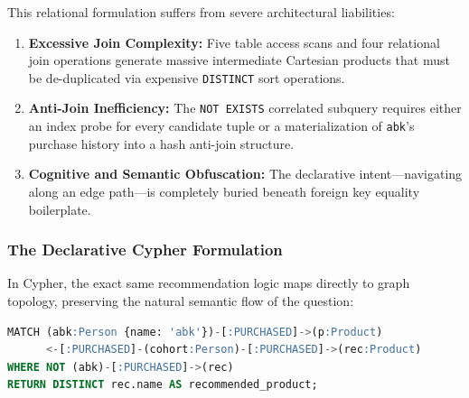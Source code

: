 \documentclass[10pt,twocolumn,letterpaper]{article}
\begin{document}
This relational formulation suffers from severe architectural liabilities:
\begin{enumerate}
    \item \textbf{Excessive Join Complexity:} Five table access scans and four relational join operations generate massive intermediate Cartesian products that must be de-duplicated via expensive \texttt{DISTINCT} sort operations.
    \item \textbf{Anti-Join Inefficiency:} The \texttt{NOT EXISTS} correlated subquery requires either an index probe for every candidate tuple or a materialization of \texttt{abk}'s purchase history into a hash anti-join structure.
    \item \textbf{Cognitive and Semantic Obfuscation:} The declarative intent---navigating along an edge path---is completely buried beneath foreign key equality boilerplate.
\end{enumerate}

\subsubsection{The Declarative Cypher Formulation}
In Cypher, the exact same recommendation logic maps directly to graph topology, preserving the natural semantic flow of the question:

\begin{lstlisting}[language=SQL]
MATCH (abk:Person {name: 'abk'})-[:PURCHASED]->(p:Product)
      <-[:PURCHASED]-(cohort:Person)-[:PURCHASED]->(rec:Product)
WHERE NOT (abk)-[:PURCHASED]->(rec)
RETURN DISTINCT rec.name AS recommended_product;
\end{lstlisting}
\end{document}
